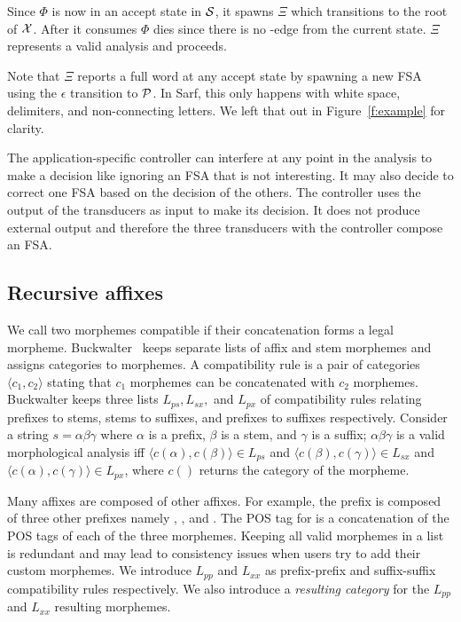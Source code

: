 \documentclass[11pt]{article}
\newcommand{\noTrRL}[1]{\transfalse\RL{#1}\transtrue}
\newcommand{\noTrnoVocRL}[1]{\transfalse\novocalize\noTrRL{#1}\vocalize\transtrue}
\begin{document}
Since $\Phi$ is now in an accept state in ${\cal S}$, it 
spawns $\Xi$ which transitions to the root of ${\cal X}$. 
After it consumes \noTrnoVocRL{h--} $\Phi$ dies since there is no
\noTrnoVocRL{h--}-edge from the current state.
$\Xi$ represents a valid analysis and proceeds.
       
Note that $\Xi$ reports a full word at any accept state
by spawning a new FSA using the $\epsilon$ transition
to ${\cal P}$.
In Sarf, this only happens with white space, delimiters, 
and non-connecting letters. 
We left that out in Figure~\ref{f:example} for clarity. 
       
The application-specific controller can interfere at any point in the 
analysis to make a decision like ignoring an FSA that 
is not interesting. 
It may also decide to correct one FSA
based on the decision of the others. 
The controller uses the output of the transducers as input
to make its decision. 
It does not produce external output and therefore 
the three transducers with the 
controller compose an FSA.

\subsection{Recursive affixes}
\label{sec:recaffix}

We call two morphemes compatible if their concatenation
forms a legal morpheme. 
Buckwalter~ keeps separate lists 
of affix and stem morphemes and assigns categories to
morphemes. 
A compatibility rule is a pair of categories 
$\langle c_1, c_2\rangle$  stating that $c_1$ morphemes
can be concatenated with $c_2$ morphemes.
Buckwalter keeps three lists $L_{ps}, L_{sx},$ and $L_{px}$ 
of compatibility rules relating
prefixes to stems, stems to suffixes, and prefixes to suffixes
respectively. 
Consider a string $s=\alpha\beta\gamma$ where $\alpha$ is 
a prefix, $\beta$ is a stem, and $\gamma$ is a suffix;
$\alpha\beta\gamma$ is a 
valid morphological analysis iff
$\langle c(\alpha),c(\beta)\rangle \in L_{ps}$ and
$\langle c(\beta),c(\gamma)\rangle \in L_{sx}$ and
$\langle c(\alpha),c(\gamma)\rangle \in L_{px}$, where
$c()$ returns the category of the morpheme.

Many affixes are composed of other affixes. For example,
the prefix  is composed of three other prefixes
namely , , and .
The POS tag for  is a concatenation
of the POS tags of each of the three morphemes. 
Keeping all valid morphemes in a list
is redundant and may lead to consistency issues when
users try to add their custom morphemes.
We introduce $L_{pp}$ and
$L_{xx}$ as prefix-prefix and suffix-suffix 
compatibility rules respectively.
We also introduce a {\em resulting category}
for the $L_{pp}$ and  $L_{xx}$ resulting morphemes.
\end{document}
